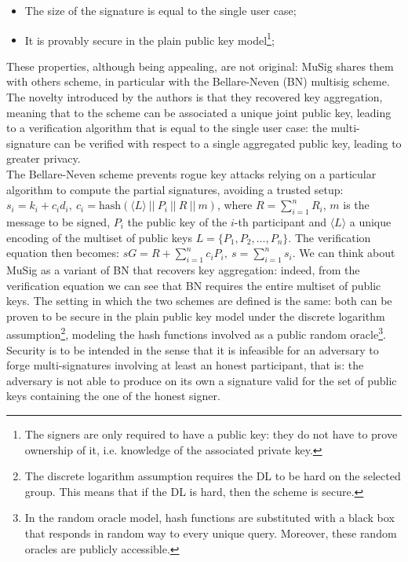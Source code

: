 \begin{itemize}
	\item The size of the signature is equal to the single user case;
	\item It is provably secure in the plain public key model\footnote{The signers are only required to have a public key: they do not have to prove ownership of it, i.e. knowledge of the associated private key.};
\end{itemize}
These properties, although being appealing, are not original: MuSig shares them with others scheme, in particular with the Bellare-Neven (BN) multisig scheme. The novelty introduced by the authors is that they recovered key aggregation, meaning that to the scheme can be associated a unique joint public key, leading to a verification algorithm that is equal to the single user case: the multi-signature can be verified with respect to a single aggregated public key, leading to greater privacy. 
\\
The Bellare-Neven scheme prevents rogue key attacks relying on a particular algorithm to compute the partial signatures, avoiding a trusted setup: $s_i = k_i + c_id_i, \ c_i = \text{hash}(\langle L \rangle\ || \ P_i \ || \ R \ || \ m)$, where $R = \sum_{i = 1}^{n}R_i$, $m$ is the message to be signed, $P_i$ the public key of the $i$-th participant and $\langle L \rangle$ a unique encoding of the multiset of public keys $L = \{P_1, P_2, ..., P_n\}$. The verification equation then becomes: $sG = R + \sum_{i = 1}^{n}c_iP_i, \ s = \sum_{i = 1}^{n}s_i$. We can think about MuSig as a variant of BN that recovers key aggregation: indeed, from the verification equation we can see that BN requires the entire multiset of public keys. The setting in which the two schemes are defined is the same: both can be proven to be secure in the plain public key model under the discrete logarithm assumption\footnote{The discrete logarithm assumption requires the DL to be hard on the selected group. This means that if the DL is hard, then the scheme is secure.}, modeling the hash functions involved as a public random oracle\footnote{In the random oracle model, hash functions are substituted with a black box that responds in random way to every unique query. Moreover, these random oracles are publicly accessible.}.  
\\
Security is to be intended in the sense that it is infeasible for an adversary to forge multi-signatures involving at least an honest participant, that is: the adversary is not able to produce on its own a signature valid for the set of public keys containing the one of the honest signer.
